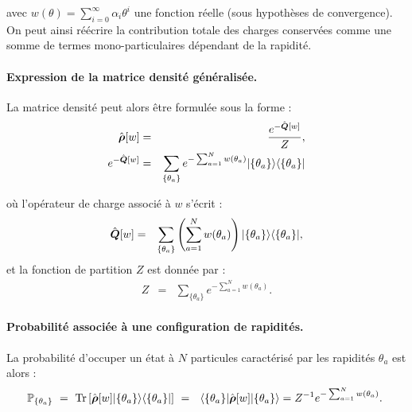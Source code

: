 avec $w(\theta) = \sum_{i=0}^\infty \alpha_i \theta^i$ une fonction réelle (sous hypothèses de convergence). On peut ainsi réécrire la contribution totale des charges conservées comme une somme de termes mono-particulaires dépendant de la rapidité.

\paragraph{Expression de la matrice densité généralisée.}
La matrice densité peut alors être formulée sous la forme :	
\begin{eqnarray}
	\hat{\bm{\rho}}[w] & = & \frac{e^{-\hat{\bm{Q}}[w]}}{Z}, \\
	e^{-\hat{\bm{Q}}[w]} & = & 	\sum_{\{\theta_a \}} e^{- \sum_{a = 1}^N w(\theta_a) } \vert \{ \theta_a\} \rangle \langle  \{ \theta_a\}  \vert 
\end{eqnarray}
 
	
où l'opérateur de charge associé à $w$ s’écrit :
\begin{eqnarray}
	\hat{\bm{Q}} [w]   & = &  \sum_{\{\theta_a \}} \left ( \sum_{a = 1}^N w ( \theta_a )  \right ) \vert \{ \theta_a \} \rangle \langle \{ \theta_a \} \vert,	
\end{eqnarray}
et la fonction de partition $Z$ est donnée par :
\begin{eqnarray}
	Z  & = & \sum_{\{\theta_a \}} e^{-\sum_{a = 1}^N w(\theta_a)}.		
\end{eqnarray}

\paragraph{ Probabilité associée à une configuration de rapidités.}

La probabilité d’occuper un état à $N$ particules caractérisé par les rapidités ${\theta_a}$ est alors :
\begin{eqnarray}
	\mathbb{P}_{\{ \theta_a \}} ~=~ \mathrm{Tr} \left [\operator{\rho}[w] \vert \{ \theta_a \} \rangle \langle \{ \theta_a \} \vert  \right ] ~= ~ \langle \{ \theta_a \}\vert \operator{\rho}[w] \vert  \{ \theta_a \} \rangle = Z^{-1}e^{-\sum_{a = 1}^N w(\theta_a)}. 		
\end{eqnarray}

